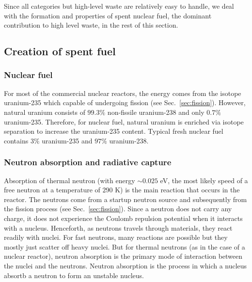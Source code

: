 \documentclass[nofootinbib,preprint,aps]{revtex4-1}
\begin{document}
    Since all categories but high-level waste are relatively easy to handle, we deal with the formation and
    properties of spent nuclear fuel, the dominant contribution to high level waste, in the rest of this section.

    \subsection{Creation of spent fuel}
    \label{sec:waste:spentfuel}
    \subsubsection{Nuclear fuel}
    For most of the commercial nuclear reactors, the energy comes from the isotope uranium-235 which
    capable of undergoing fission (see Sec.~\ref{sec:fission}). However, natural uranium consists of $99.3\%$
    non-fissile uranium-238 and only $0.7\%$ uranium-235. Therefore, for nuclear fuel, natural uranium is enriched
    via isotope separation to increase the uranium-235 content. Typical fresh nuclear fuel contains $3\%$ uranium-235
    and $97\%$ uranium-238.
    \subsubsection{Neutron absorption and radiative capture}
    \label{sec:capture}
    Absorption of thermal neutron (with energy $\sim 0.025$ eV, the most likely speed of a free neutron at 
    a temperature of $290$ K) is the main reaction that
    occurs in the reactor. The neutrons come from a startup neutron source and subsequently from the fission
    process (see Sec.~\ref{sec:fission}).
    Since a neutron does not carry any charge, it does not experience the Coulomb repulsion potential when
    it interacts
    with a nucleus.
    Henceforth, as neutrons travels through materials, they react readily with nuclei.
    For fast neutrons, many reactions are possible but they mostly just scatter off heavy nuclei.
    But for thermal neutrons (as in the case of a nuclear reactor), neutron absorption
    is the primary mode of interaction between the nuclei and the neutrons.
    Neutron absorption is the process in which a nucleus absortb a neutron to form an unstable
    nucleus.
\end{document}
